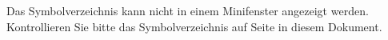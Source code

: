 
Das Symbolverzeichnis kann nicht in einem Minifenster angezeigt werden. Kontrollieren Sie bitte das Symbolverzeichnis auf Seite \pageref{symbole} in diesem Dokument.
